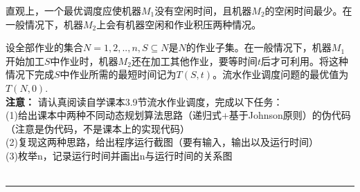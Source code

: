 \documentclass[UTF8,16pt]{article} %
\begin{document}
直观上，一个最优调度应使机器$M_1$没有空闲时间，且机器$M_2$的空闲时间最少。在一般情况下，机器$M_2$上会有机器空闲和作业积压两种情况。

设全部作业的集合$N={1,2,..,n}, S\subseteq N$是$N$的作业子集。在一般情况下，机器$M_1$开始加工$S$中作业时，机器$M_2$还在加工其他作业，要等时间$t$后才可利用。将这种情况下完成$S$中作业所需的最短时间记为$T(S,t)$。流水作业调度问题的最优值为$T(N,0)$.\\
\textbf{注意：}
请认真阅读自学课本3.9节流水作业调度，完成以下任务：\\
(1)给出课本中两种不同动态规划算法思路（递归式+基于Johnson原则）的伪代码（注意是伪代码，不是课本上的实现代码）\\
(2)复现这两种思路，给出程序运行截图（要有输入，输出以及运行时间）\\
(3)枚举n，记录运行时间并画出n与运行时间的关系图\\


{}\\
\rule[0pt]{14.3cm}{0.05em}


\vbox{} %
\vbox{} %

\end{document}
